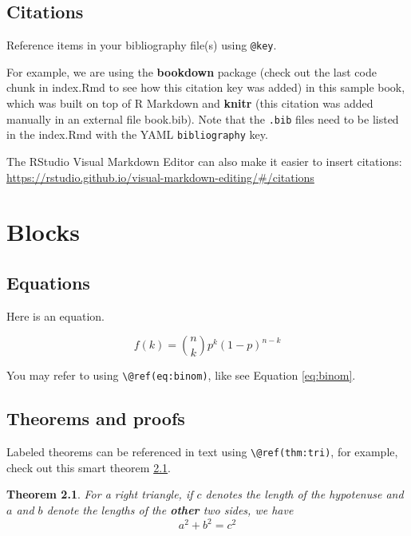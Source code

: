 \documentclass[
]{book}
\newtheorem{theorem}{Theorem}[chapter]
\theoremstyle{definition}
\theoremstyle{definition}
\theoremstyle{definition}
\theoremstyle{definition}
\theoremstyle{remark}
\begin{document}
\hypertarget{citations}{%
\section{Citations}\label{citations}}

Reference items in your bibliography file(s) using \texttt{@key}.

For example, we are using the \textbf{bookdown} package \citep{R-bookdown} (check out the last code chunk in index.Rmd to see how this citation key was added) in this sample book, which was built on top of R Markdown and \textbf{knitr} \citep{xie2015} (this citation was added manually in an external file book.bib).
Note that the \texttt{.bib} files need to be listed in the index.Rmd with the YAML \texttt{bibliography} key.

The RStudio Visual Markdown Editor can also make it easier to insert citations: \url{https://rstudio.github.io/visual-markdown-editing/\#/citations}

\hypertarget{blocks}{%
\chapter{Blocks}\label{blocks}}

\hypertarget{equations}{%
\section{Equations}\label{equations}}

Here is an equation.

\begin{equation} 
  f\left(k\right) = \binom{n}{k} p^k\left(1-p\right)^{n-k}
  \label{eq:binom}
\end{equation}

You may refer to using \texttt{\textbackslash{}@ref(eq:binom)}, like see Equation \eqref{eq:binom}.

\hypertarget{theorems-and-proofs}{%
\section{Theorems and proofs}\label{theorems-and-proofs}}

Labeled theorems can be referenced in text using \texttt{\textbackslash{}@ref(thm:tri)}, for example, check out this smart theorem \ref{thm:tri}.

\begin{theorem}
\protect\hypertarget{thm:tri}{}\label{thm:tri}For a right triangle, if \(c\) denotes the \emph{length} of the hypotenuse
and \(a\) and \(b\) denote the lengths of the \textbf{other} two sides, we have
\[a^2 + b^2 = c^2\]
\end{theorem}
\end{document}

